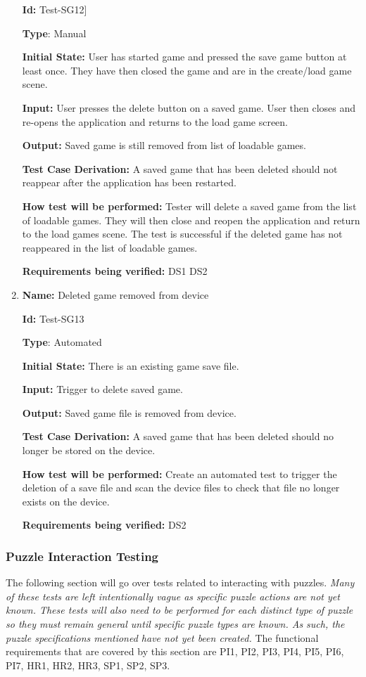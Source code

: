 \documentclass[12pt, titlepage]{article}
\begin{document}
\begin{enumerate}
\textbf{Id:} Test-SG12]

\textbf{Type}: Manual

\textbf{Initial State:} User has started game and pressed the save game button at least once. They have then closed the game and are in the create/load game scene. 

\textbf{Input:} User presses the delete button on a saved game. User then closes and re-opens the application and returns to the load game screen.

\textbf{Output:} Saved game is still removed from list of loadable games.

\textbf{Test Case Derivation:}
A saved game that has been deleted should not reappear after the application has been restarted.

\textbf{How test will be performed:}
Tester will delete a saved game from the list of loadable games. They will then close and reopen the application and return to the load games scene. The test is successful if the deleted game has not reappeared in the list of loadable games.

\textbf{Requirements being verified: } DS1 DS2

\item{\textbf{Name:} Deleted game removed from device}

\textbf{Id:} Test-SG13

\textbf{Type}: Automated

\textbf{Initial State:} There is an existing game save file.

\textbf{Input:} Trigger to delete saved game.

\textbf{Output:} Saved game file is removed from device.

\textbf{Test Case Derivation:}
A saved game that has been deleted should no longer be stored on the device.

\textbf{How test will be performed:}
Create an automated test to trigger the deletion of a save file and scan the device files to check that file no longer exists on the device.

\textbf{Requirements being verified: } DS2

\end{enumerate}

\subsubsection{Puzzle Interaction Testing}
The following section will go over tests related to interacting with puzzles.
\textit{Many of these tests are left intentionally vague as specific puzzle actions are not yet known. These tests will also need to be performed for each distinct type of puzzle so they must remain general until specific puzzle types are known. As such, the puzzle specifications mentioned have not yet been created. } The functional requirements that are covered by this section are PI1, PI2, PI3, PI4, PI5, PI6, PI7, HR1, HR2, HR3, SP1, SP2, SP3.
\end{document}
